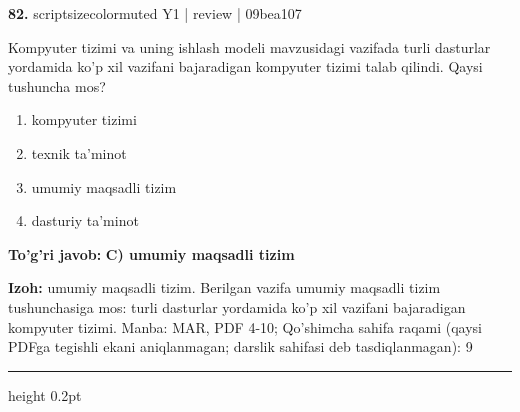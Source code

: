 \documentclass[10pt,a4paper]{article}
\begin{document}
{\bfseries\sffamily\color{ink} 82.} {scriptsizecolor{muted} Y1 | review | 09bea107}
\par
Kompyuter tizimi va uning ishlash modeli mavzusidagi vazifada turli dasturlar yordamida ko'p xil vazifani bajaradigan kompyuter tizimi talab qilindi. Qaysi tushuncha mos?
\begin{enumerate}[label=\Alph*),leftmargin=9mm]
\item kompyuter tizimi
\item texnik ta'minot
\item umumiy maqsadli tizim
\item dasturiy ta'minot
\end{enumerate}
\begin{tcolorbox}[enhanced,breakable,colback=teal!4,colframe=teal!60!black,boxrule=0.45pt,arc=1.2mm,left=2.7mm,right=2.7mm,top=1.8mm,bottom=1.8mm,before skip=2mm,after skip=2mm]
{\bfseries\sffamily\color{teal}To'g'ri javob:} \textbf{C) umumiy maqsadli tizim}
\par\smallskip
{\bfseries Izoh:} umumiy maqsadli tizim. Berilgan vazifa umumiy maqsadli tizim tushunchasiga mos: turli dasturlar yordamida ko'p xil vazifani bajaradigan kompyuter tizimi. Manba: MAR, PDF 4-10; Qo'shimcha sahifa raqami (qaysi PDFga tegishli ekani aniqlanmagan; darslik sahifasi deb tasdiqlanmagan): 9
\end{tcolorbox}
\vspace{2mm}\hrule height 0.2pt\vspace{3mm}
\end{document}
